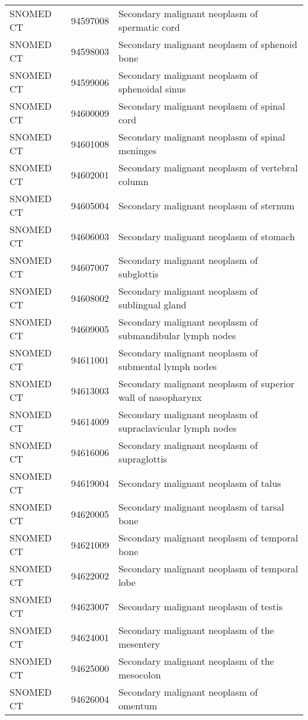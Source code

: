 \begin{longtable}{p{}p{}p{}}
  SNOMED CT & 94597008 & Secondary malignant neoplasm of spermatic cord \\ 
  SNOMED CT & 94598003 & Secondary malignant neoplasm of sphenoid bone \\ 
  SNOMED CT & 94599006 & Secondary malignant neoplasm of sphenoidal sinus \\ 
  SNOMED CT & 94600009 & Secondary malignant neoplasm of spinal cord \\ 
  SNOMED CT & 94601008 & Secondary malignant neoplasm of spinal meninges \\ 
  SNOMED CT & 94602001 & Secondary malignant neoplasm of vertebral column \\ 
  SNOMED CT & 94605004 & Secondary malignant neoplasm of sternum \\ 
  SNOMED CT & 94606003 & Secondary malignant neoplasm of stomach \\ 
  SNOMED CT & 94607007 & Secondary malignant neoplasm of subglottis \\ 
  SNOMED CT & 94608002 & Secondary malignant neoplasm of sublingual gland \\ 
  SNOMED CT & 94609005 & Secondary malignant neoplasm of submandibular lymph nodes \\ 
  SNOMED CT & 94611001 & Secondary malignant neoplasm of submental lymph nodes \\ 
  SNOMED CT & 94613003 & Secondary malignant neoplasm of superior wall of nasopharynx \\ 
  SNOMED CT & 94614009 & Secondary malignant neoplasm of supraclavicular lymph nodes \\ 
  SNOMED CT & 94616006 & Secondary malignant neoplasm of supraglottis \\ 
  SNOMED CT & 94619004 & Secondary malignant neoplasm of talus \\ 
  SNOMED CT & 94620005 & Secondary malignant neoplasm of tarsal bone \\ 
  SNOMED CT & 94621009 & Secondary malignant neoplasm of temporal bone \\ 
  SNOMED CT & 94622002 & Secondary malignant neoplasm of temporal lobe \\ 
  SNOMED CT & 94623007 & Secondary malignant neoplasm of testis \\ 
  SNOMED CT & 94624001 & Secondary malignant neoplasm of the mesentery \\ 
  SNOMED CT & 94625000 & Secondary malignant neoplasm of the mesocolon \\ 
  SNOMED CT & 94626004 & Secondary malignant neoplasm of omentum \\ 

\end{longtable}
